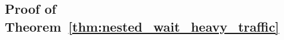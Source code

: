 \subsection{Proof of Theorem~\ref{thm:nested_wait_heavy_traffic}}\label{appendix::proof of nested_wait_heavy_traffic}

